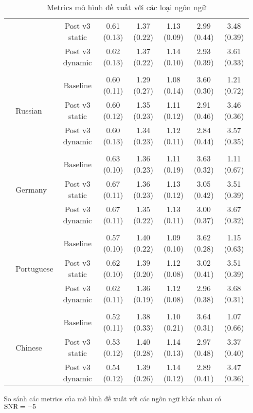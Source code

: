 \begin{sidewaystable}
\begin{subtable}{\textwidth}
\begin{tabular}{llcccccc}
					&               &Post v3 static & 0.61 (0.13)   & 1.37 (0.22)   & 1.13 (0.09)   & 2.99 (0.44)   & 3.48 (0.39) \\
					&               &Post v3 dynamic        & 0.62 (0.13)   & 1.37 (0.22)   & 1.14 (0.10)   & 2.93 (0.39)   & 3.61 (0.33) \\
					&&&&&&&\\
					& \multirow{3}{*}{Russian}      &Baseline       & 0.60 (0.11)   & 1.29 (0.27)   & 1.08 (0.14)   & 3.60 (0.30)   & 1.21 (0.72) \\
					&               &Post v3 static & 0.60 (0.12)   & 1.35 (0.23)   & 1.11 (0.12)   & 2.91 (0.46)   & 3.46 (0.36) \\
					&               &Post v3 dynamic        & 0.60 (0.13)   & 1.34 (0.23)   & 1.12 (0.11)   & 2.84 (0.44)   & 3.57 (0.35) \\
					&&&&&&&\\
					& \multirow{3}{*}{Germany}      &Baseline       & 0.63 (0.10)   & 1.36 (0.23)   & 1.11 (0.19)   & 3.63 (0.32)   & 1.11 (0.67) \\
					&               &Post v3 static & 0.67 (0.11)   & 1.36 (0.23)   & 1.13 (0.12)   & 3.05 (0.42)   & 3.51 (0.39) \\
					&               &Post v3 dynamic        & 0.67 (0.11)   & 1.35 (0.22)   & 1.13 (0.11)   & 3.00 (0.37)   & 3.67 (0.32) \\
					&&&&&&&\\
					& \multirow{3}{*}{Portuguese}   &Baseline       & 0.57 (0.10)   & 1.40 (0.22)   & 1.09 (0.10)   & 3.62 (0.28)   & 1.15 (0.63) \\
					&               &Post v3 static & 0.62 (0.10)   & 1.39 (0.20)   & 1.12 (0.08)   & 3.02 (0.41)   & 3.51 (0.39) \\
					&               &Post v3 dynamic        & 0.62 (0.11)   & 1.36 (0.19)   & 1.12 (0.08)   & 2.96 (0.38)   & 3.68 (0.31) \\
					&&&&&&&\\
					& \multirow{3}{*}{Chinese}      &Baseline       & 0.52 (0.11)   & 1.38 (0.33)   & 1.10 (0.21)   & 3.64 (0.31)   & 1.07 (0.66) \\
					&               &Post v3 static & 0.53 (0.12)   & 1.40 (0.28)   & 1.14 (0.13)   & 2.97 (0.48)   & 3.37 (0.40) \\
					&               &Post v3 dynamic        & 0.54 (0.12)   & 1.39 (0.26)   & 1.14 (0.12)   & 2.89 (0.41)   & 3.47 (0.36) \\
					\hline
				\end{tabular}
				\caption{So sánh các metrics của mô hình đề xuất với các ngôn ngữ khác nhau có $\text{SNR}=-5$}
			\end{subtable}
		
		\caption{Metrics mô hình đề xuất với các loại ngôn ngữ}
		\label{re::compare_models_multilingual}
		\end{sidewaystable}
	
